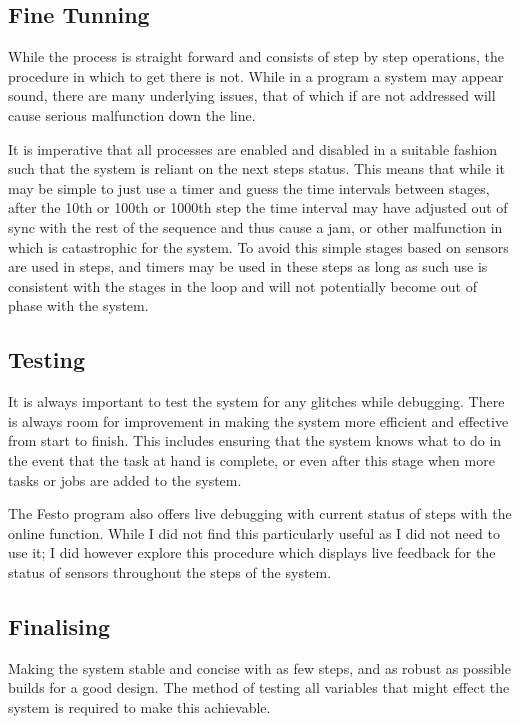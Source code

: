 \documentclass[a4paper, 10pt]{article}
\begin{document}

\subsection{Fine Tunning} 
While the process is straight forward and consists of step by step operations, the procedure in which to get there is not. While in a program a system may appear sound, there are many underlying issues, that of which if are not addressed will cause serious malfunction down the line. 

It is imperative that all processes are enabled and disabled in a suitable fashion such that the system is reliant on the next steps status. This means that while it may be simple to just use a timer and guess the time intervals between stages, after the 10th or 100th or 1000th step the time interval may have adjusted out of sync with the rest of the sequence and thus cause a jam, or other malfunction in which is catastrophic for the system. To avoid this simple stages based on sensors are used in steps, and timers may be used in these steps as long as such use is consistent with the stages in the loop and will not potentially become out of phase with the system.


\subsection{Testing}
It is always important to test the system for any glitches while debugging. There is always room for improvement in making the system more efficient and effective from start to finish. This includes ensuring that the system knows what to do in the event that the task at hand is complete, or even after this stage when more tasks or jobs are added to the system.

The Festo program also offers live debugging with current status of steps with the online function. While I did not find this particularly useful as I did not need to use it; I did however explore this procedure which displays live feedback for the status of sensors throughout the steps of the system.



\subsection{Finalising}
Making the system stable and concise with as few steps, and as robust as possible builds for a good design. The method of testing all variables that might effect the system is required to make this achievable. 
\end{document}
